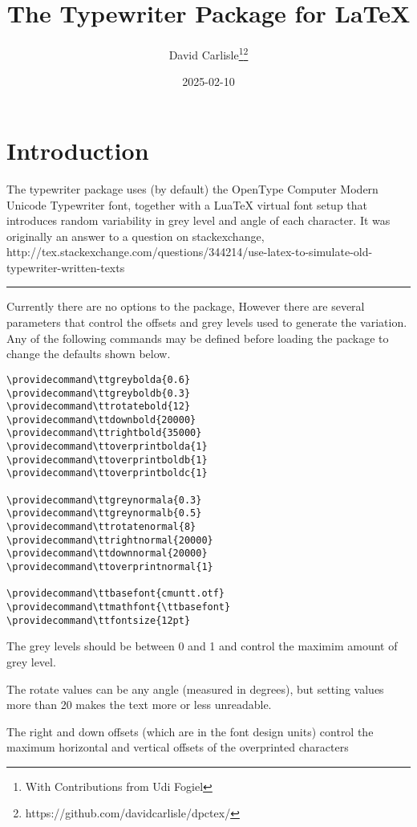 \documentclass{article}
\providecommand\ttbasefont{QTAntiquePost.otf}
\providecommand\ttmathfont{cmuntt.otf}
\providecommand\ttoverprintnormal{0}
\providecommand\ttoverprintbolda{1}
\providecommand\ttoverprintboldb{0}
\providecommand\ttoverprintboldc{0}
\providecommand\ttgreynormala{0.5}
\providecommand\ttrotatenormal{3}
\begin{document}
\title{The Typewriter Package for LaTeX}
\author{David Carlisle\thanks{With Contributions from Udi Fogiel}\thanks{https://github.com/davidcarlisle/dpctex/}}
\date{2025-02-10}

\maketitle

\section{Introduction}
The typewriter package uses (by default) the OpenType Computer Modern Unicode
Typewriter font, together with a LuaTeX virtual font setup that
introduces random variability in grey level and angle of each
character. It was originally an answer to a question on stackexchange,
http://tex.stackexchange.com/questions/344214/use-latex-to-simulate-old-typewriter-written-texts


\hrule

Currently there are no options to the package, However there are several parameters that control the offsets
and grey levels used to generate the variation. Any of the following
commands may be defined before loading the package to change the defaults shown below.

\begin{verbatim}
\providecommand\ttgreybolda{0.6}
\providecommand\ttgreyboldb{0.3}
\providecommand\ttrotatebold{12}
\providecommand\ttdownbold{20000}
\providecommand\ttrightbold{35000}
\providecommand\ttoverprintbolda{1}
\providecommand\ttoverprintboldb{1}
\providecommand\ttoverprintboldc{1}

\providecommand\ttgreynormala{0.3}
\providecommand\ttgreynormalb{0.5}
\providecommand\ttrotatenormal{8}
\providecommand\ttrightnormal{20000}
\providecommand\ttdownnormal{20000}
\providecommand\ttoverprintnormal{1}

\providecommand\ttbasefont{cmuntt.otf}
\providecommand\ttmathfont{\ttbasefont}
\providecommand\ttfontsize{12pt}
\end{verbatim}

The grey levels should be between 0 and 1 and control the maximim
amount of grey level.

The rotate values can be any angle (measured in degrees), but setting
values more than 20 makes the text more or less unreadable.

The right and down offsets (which are in the font design units) control the
maximum horizontal and vertical offsets of the overprinted characters
\end{document}
